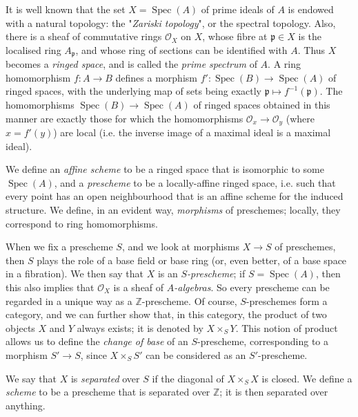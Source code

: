   It is well known that the set \(X=\operatorname {Spec}(A)\) of prime ideals of \(A\) is endowed with a natural topology: the "\emph{Zariski topology}", or the spectral topology.
  Also, there is a sheaf of commutative rings \(\mathcal {O}_X\) on \(X\), whose fibre at \(\mathfrak {p}\in  X\) is the localised ring \(A_\mathfrak {p}\), and whose ring of sections can be identified with \(A\).
  Thus \(X\) becomes a \emph{ringed space}, and is called the \emph{prime spectrum} of \(A\).
  A ring homomorphism \(f\colon  A\to  B\) defines a morphism \(f'\colon \operatorname {Spec}(B)\to \operatorname {Spec}(A)\) of ringed spaces, with the underlying map of sets being exactly \(\mathfrak {p}\mapsto  f^{-1}(\mathfrak {p})\).
  The homomorphisms \(\operatorname {Spec}(B)\to \operatorname {Spec}(A)\) of ringed spaces obtained in this manner are exactly those for which the homomorphisms \(\mathcal {O}_x\to \mathcal {O}_y\) (where \(x=f'(y)\)) are local (i.e. the inverse image of a maximal ideal is a maximal ideal).\par{}We define an \emph{affine scheme} to be a ringed space that is isomorphic to some \(\operatorname {Spec}(A)\), and a \emph{prescheme} to be a locally-affine ringed space, i.e. such that every point has an open neighbourhood that is an affine scheme for the induced structure.
  We define, in an evident way, \emph{morphisms} of preschemes;
  locally, they correspond to ring homomorphisms.\par{}When we fix a prescheme \(S\), and we look at morphisms \(X\to  S\) of preschemes, then \(S\) plays the role of a base field or base ring (or, even better, of a base space in a fibration).
  We then say that \(X\) is an \emph{\(S\)-prescheme};
  if \(S=\operatorname {Spec}(A)\), then this also implies that \(\mathcal {O}_X\) is a sheaf of \emph{\(A\)-algebras}.
  So every prescheme can be regarded in a unique way as a \(\mathbb {Z}\)-prescheme.
  Of course, \(S\)-preschemes form a category, and we can further show that, in this category, the product of two objects \(X\) and \(Y\) always exists;
  it is denoted by \(X\times _S Y\).
  This notion of product allows us to define the \emph{change of base} of an \(S\)-prescheme, corresponding to a morphism \(S'\to  S\), since \(X\times _S S'\) can be considered as an \(S'\)-prescheme.\par{}We say that \(X\) is \emph{separated} over \(S\) if the diagonal of \(X\times _S X\) is closed.
  We define a \emph{scheme} to be a prescheme that is separated over \(\mathbb {Z}\);
  it is then separated over anything.
